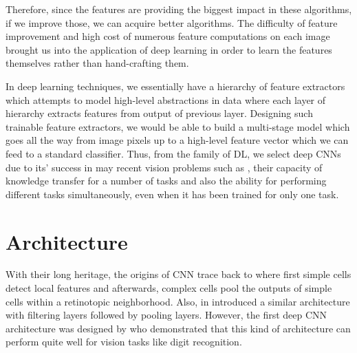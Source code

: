 \indent Therefore, since the features are providing the biggest impact in these algorithms, if we improve those, we can acquire better algorithms. The difficulty of feature improvement and high cost of numerous feature computations on each image brought us into the application of deep learning in order to learn the features themselves rather than hand-crafting them. 


In deep learning techniques, we essentially have a hierarchy of feature extractors which attempts to model high-level abstractions in data\cite{deng2014deep, bengio2009learning, bengio2013representation, arel2010deep, schmidhuber2015deep} where each layer of hierarchy extracts features from output of previous layer. Designing such trainable feature extractors, we would be able to build a multi-stage model which goes all the way from image pixels up to a high-level feature vector which we can feed to a standard classifier. Thus, from the family of DL, we select deep CNNs due to its' success in may recent vision problems such as \cite{cirecsan2011convolutional, ciresan2015multi, wan2013regularization, cirecsan2012multi}, their capacity of knowledge transfer for a number of tasks and also the ability for performing different tasks simultaneously, even when it has been trained for only one task\cite{zhou2014learning}.  

\section{Architecture}

With their long heritage, the origins of CNN trace back to \cite{hubel1962receptive} where first simple cells  detect local features and afterwards, complex cells pool the outputs of simple cells within a retinotopic  neighborhood. Also, \citeauthor*{fukushima1975cognitron} in \cite{fukushima1975cognitron, fukushima1980neocognitron} introduced a similar architecture with filtering layers followed by pooling layers. However, the first deep CNN architecture was designed by \citealt{lecun1989backpropagation} who demonstrated that this kind of architecture can perform quite well for vision tasks like digit recognition.

